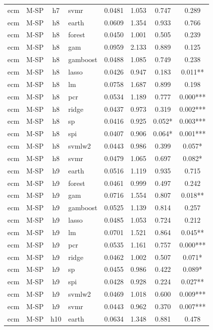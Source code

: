 \begin{ThreePartTable}
\begin{longtable}[t]{llclcccc}
ecm & M-SP & h7 & svmr & 0.0481 & 1.053 & 0.747 & 0.289\\
\addlinespace
ecm & M-SP & h8 & earth & 0.0609 & 1.354 & 0.933 & 0.766\\
ecm & M-SP & h8 & forest & 0.0450 & 1.001 & 0.505 & 0.239\\
ecm & M-SP & h8 & gam & 0.0959 & 2.133 & 0.889 & 0.125\\
ecm & M-SP & h8 & gamboost & 0.0488 & 1.085 & 0.749 & 0.238\\
ecm & M-SP & h8 & lasso & 0.0426 & 0.947 & 0.183 & 0.011**\\
ecm & M-SP & h8 & lm & 0.0758 & 1.687 & 0.899 & 0.198\\
ecm & M-SP & h8 & pcr & 0.0534 & 1.189 & 0.777 & 0.000***\\
ecm & M-SP & h8 & ridge & 0.0437 & 0.973 & 0.319 & 0.002***\\
ecm & M-SP & h8 & sp & 0.0416 & 0.925 & 0.052* & 0.003***\\
ecm & M-SP & h8 & spi & 0.0407 & 0.906 & 0.064* & 0.001***\\
ecm & M-SP & h8 & svmlw2 & 0.0443 & 0.986 & 0.399 & 0.057*\\
ecm & M-SP & h8 & svmr & 0.0479 & 1.065 & 0.697 & 0.082*\\
\addlinespace
ecm & M-SP & h9 & earth & 0.0516 & 1.119 & 0.935 & 0.715\\
ecm & M-SP & h9 & forest & 0.0461 & 0.999 & 0.497 & 0.242\\
ecm & M-SP & h9 & gam & 0.0716 & 1.554 & 0.807 & 0.018**\\
ecm & M-SP & h9 & gamboost & 0.0525 & 1.139 & 0.814 & 0.257\\
ecm & M-SP & h9 & lasso & 0.0485 & 1.053 & 0.724 & 0.212\\
ecm & M-SP & h9 & lm & 0.0701 & 1.521 & 0.864 & 0.045**\\
ecm & M-SP & h9 & pcr & 0.0535 & 1.161 & 0.757 & 0.000***\\
ecm & M-SP & h9 & ridge & 0.0462 & 1.002 & 0.507 & 0.071*\\
ecm & M-SP & h9 & sp & 0.0455 & 0.986 & 0.422 & 0.089*\\
ecm & M-SP & h9 & spi & 0.0428 & 0.928 & 0.224 & 0.027**\\
ecm & M-SP & h9 & svmlw2 & 0.0469 & 1.018 & 0.600 & 0.009***\\
ecm & M-SP & h9 & svmr & 0.0443 & 0.962 & 0.370 & 0.007***\\
\addlinespace
ecm & M-SP & h10 & earth & 0.0634 & 1.348 & 0.881 & 0.478\\

\end{longtable}
\end{ThreePartTable}
